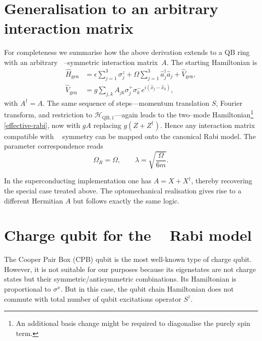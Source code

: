\documentclass[reprint, aps, prx, amsmath, amssymb, longbibliography, superscriptaddress]{revtex4-2}
\DeclareMathOperator{\Zthree}{\mathbb{Z}_3}
\begin{document}
\appendix

\section{Generalisation to an arbitrary interaction matrix}
\label{arbitrary-interaction-summary}

For completeness we summarise how the above derivation extends to a QB ring
with an arbitrary $\Zthree$--symmetric interaction matrix~$A$.  The starting
Hamiltonian is
\begin{equation}
\label{arbitary-interaction-hamiltonian}
  \begin{aligned}
    \hat H_{\text{gen}} &= \epsilon \sum_{j=1}^{3} \sigma_j^z
      + \Omega \sum_{j=1}^{3} \hat a_j^{\dagger} \hat a_j + \hat V_{\text{gen}},
      \\
    \hat V_{\text{gen}} &= g \sum_{j,k} A_{jk}
      \sigma_j^{+} \sigma_k^{-} e^{ i ( \hat x_j - \hat x_k ) },
  \end{aligned}
\end{equation}
with $A^{\dagger}=A$.  The same sequence of steps---momentum translation $S$,
Fourier transform, and restriction to $\mathcal H_{\text{QB},1}$---again leads
to the two--mode Hamiltonian\footnote{An additional basis change might be
required to diagonalise the purely spin term.}
\eqref{effective-rabi}, now with $gA$ replacing $g(Z+Z^{\dagger})$.  Hence any
interaction matrix compatible with $\Zthree$ symmetry can be mapped onto the
canonical Rabi model.  The parameter correspondence reads
\begin{equation}
  \Omega_R = \Omega, \qquad \lambda = \sqrt{ \frac{\Omega}{6 m} }.
\end{equation}

In the superconducting implementation one has $A = X + X^{\dagger}$, thereby
recovering the special case treated above.  The optomechanical realisation
gives rise to a different Hermitian $A$ but follows exactly the same logic.



\section{Charge qubit for the \texorpdfstring{$\Zthree$}{Z3} Rabi model}
\label{charge-qubit}



The Cooper Pair Box (CPB) qubit is the most well-known type of charge qubit. However, it is not suitable for our purposes because its eigenstates are not charge states but their symmetric/antisymmetric combinations. Its Hamiltonian is proportional to $\sigma^x$. But in this case, the qubit chain Hamiltonian does not commute with total number of qubit excitations operator $S^z$.
\end{document}

